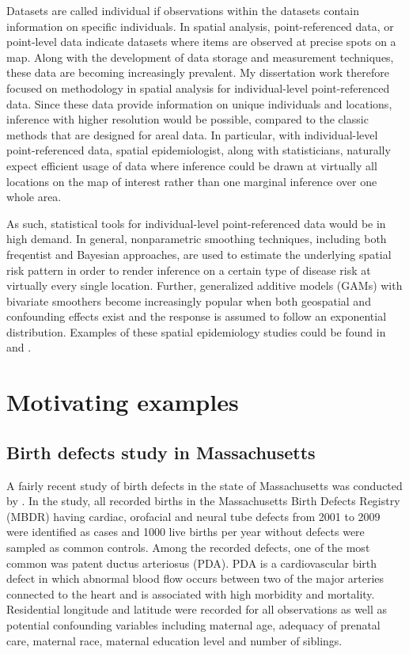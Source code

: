 Datasets are called individual if observations within the datasets contain information on specific individuals. In spatial analysis, point-referenced data, or point-level data indicate datasets where items are observed at precise spots on a map. Along with the development of data storage and measurement techniques, these data are becoming increasingly prevalent. My dissertation work therefore focused on methodology in spatial analysis for individual-level point-referenced data. Since these data provide information on unique individuals and locations, inference with higher resolution would be possible, compared to the classic methods that are designed for areal data. In particular, with individual-level point-referenced data, spatial epidemiologist, along with statisticians, naturally expect efficient usage of data where inference could be drawn at virtually all locations on the map of interest rather than one marginal inference over one whole area. 

As such, statistical tools for individual-level point-referenced data would be in high demand. In general, nonparametric smoothing techniques, including both freqentist and Bayesian approaches, are used to estimate the underlying spatial risk pattern in order to render inference on a certain type of disease risk at virtually every single location. Further, generalized additive models (GAMs) \citep{hastie1990generalized} with bivariate smoothers become increasingly popular when both geospatial and confounding effects exist and the response is assumed to follow an exponential distribution. Examples of these spatial epidemiology studies could be found in \citet{vieira2009spatial} and \citet{bristow2015spatial}. 

\section{Motivating examples}

\subsection{Birth defects study in Massachusetts}
A fairly recent study of birth defects in the state of Massachusetts was conducted by  \cite{girguis2016maternal}. In the study, all recorded births in the Massachusetts Birth Defects Registry (MBDR) having cardiac, orofacial and neural tube defects from 2001 to 2009 were identified as cases and 1000 live births per year without defects were sampled as common controls. Among the recorded defects, one of the most common was patent ductus arteriosus (PDA).  PDA is a cardiovascular birth defect in which abnormal blood flow occurs between two of the major arteries connected to the heart and is associated with high morbidity and mortality. Residential longitude and latitude were recorded for all observations as well as potential confounding variables including maternal age, adequacy of prenatal care, maternal race, maternal education level and number of siblings. 

